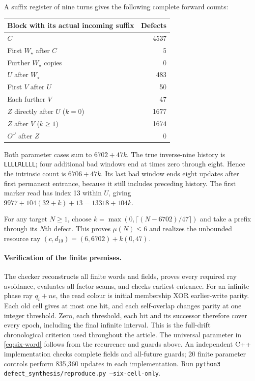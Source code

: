 A suffix register of nine turns gives the following complete forward counts:
\begin{center}
\begin{tabular}{lr}\toprule
Block with its actual incoming suffix & Defects\\\midrule
$C$ &4537\\
First $W_\star$ after $C$ &5\\
Further $W_\star$ copies &0\\
$U$ after $W_\star$ &483\\
First $V$ after $U$ &50\\
Each further $V$ &47\\
$Z$ directly after $U$ ($k=0$)&1677\\
$Z$ after $V$ ($k\ge1$)&1674\\
$O^\omega$ after $Z$&0\\\bottomrule
\end{tabular}
\end{center}
Both parameter cases sum to $6702+47k$. The true inverse-nine history is
\texttt{LLLLRLLLL}; four additional bad windows end at times zero through
eight. Hence the intrinsic count is $6706+47k$. Its last bad window ends
eight updates after first permanent entrance, because it still includes
preceding history. The first marker read has index 13 within $U$, giving
$9977+104(32+k)+13=13318+104k$.

For any target $N\ge1$, choose
$k=\max(0,\lceil(N-6702)/47\rceil)$ and take a prefix through its $N$th
defect. This proves $\mu(N)\le6$ and realizes the unbounded resource ray
$(c,d_{10})=(6,6702)+k(0,47)$.

\paragraph{Verification of the finite premises.}
The checker reconstructs all finite words and fields, proves every required
ray avoidance, evaluates all factor seams, and checks earliest entrance.
For an infinite phase ray $q_i+ne$, the read colour is initial membership
XOR earlier-write parity. Each old cell gives at most one hit, and each
self-overlap changes parity at one integer threshold. Zero, each threshold,
each hit and its successor therefore cover every epoch, including the final
infinite interval. This is the full-drift chronological criterion used
throughout the article. The universal parameter in
\eqref{eq:six-word} follows from the recurrence and guards above.
An independent C++ implementation checks complete fields and all-future guards;
20 finite parameter controls perform 835,360 updates in each implementation.
Run \texttt{python3 defect\_synthesis/reproduce.py --six-cell-only}.
